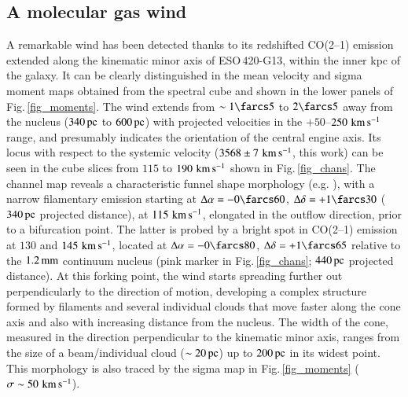 \documentclass[longauth]{aa}
\newcommand{\kms}{\,\hbox{\hbox{km}\,\hbox{s}$^{-1}$}}
\begin{document}
\subsection{A molecular gas wind}\label{CO_wind}
A remarkable wind has been detected thanks to its redshifted CO(2--1) emission extended along the kinematic minor axis of ESO\,420-G13, within the inner kpc of the galaxy. It can be clearly distinguished in the mean velocity and sigma moment maps obtained from the spectral cube and shown in the lower panels of Fig.\,\ref{fig_moments}. The wind extends from $\sim 1\farcs5$ to $2\farcs5$ away from the nucleus ($340\, \rm{pc}$ to $600\, \rm{pc}$) with projected velocities in the $+50$--$250\, \rm{\kms}$ range, and presumably indicates the orientation of the central engine axis. Its locus with respect to the systemic velocity ($3568 \pm 7\, \rm{\kms}$, this work) can be seen in the cube slices from $115$ to $190\, \rm{\kms}$ shown in Fig.\,\ref{fig_chans}. The channel map reveals a characteristic funnel shape morphology (e.g. ), with a narrow filamentary emission starting at $\Delta \alpha = -0\farcs60$, $\Delta \delta = +1\farcs30$ ($340\, \rm{pc}$ projected distance), at $115\,\rm{\kms}$, elongated in the outflow direction, prior to a bifurcation point. The latter is probed by a bright spot in CO(2--1) emission at $130$ and $145\,\rm{\kms}$, located at $\Delta \alpha = -0\farcs80$, $\Delta \delta = +1\farcs65$ relative to the $1.2\, \rm{mm}$ continuum nucleus (pink marker in Fig.\,\ref{fig_chans}; $440\, \rm{pc}$ projected distance). At this forking point, the wind starts spreading further out perpendicularly to the direction of motion, developing a complex structure formed by filaments and several individual clouds that move faster along the cone axis and also with increasing distance from the nucleus. The width of the cone, measured in the direction perpendicular to the kinematic minor axis, ranges from the size of a beam/individual cloud ($\sim 20\, \rm{pc}$) up to $200\, \rm{pc}$ in its widest point. This morphology is also traced by the sigma map in Fig.\,\ref{fig_moments} ($\sigma \sim 50\, \rm{\kms}$).
\end{document}
